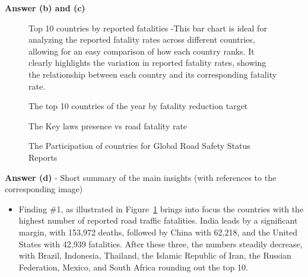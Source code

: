 \documentclass[a4paper,10pt]{article}\setlength{\textheight}{10in}\setlength{\textwidth}{6.5in}\setlength{\topmargin}{-0.125in}\setlength{\oddsidemargin}{-.2in}\setlength{\evensidemargin}{-.2in}\setlength{\headsep}{0.2in}\setlength{\footskip}{0pt}\usepackage{amsmath}\usepackage{fancyhdr}\usepackage{enumitem}\usepackage{hyperref}\usepackage{xcolor}\usepackage{graphicx}\usepackage[export]{adjustbox}\usepackage{caption}\usepackage{float}\usepackage{booktabs}\usepackage{makecell}\pagestyle{fancy}
\begin{document}
\begin{enumerate}[topsep=0mm, partopsep=0mm, leftmargin=*]
    
\textbf{Answer (b) and (c)}
    \begin{figure}[H]
        \centering
        \caption{Top 10 countries by reported fatalities -This bar chart is ideal for analyzing the reported fatality rates across different countries, allowing for an easy comparison of how each country ranks. It clearly highlights the variation in reported fatality rates, showing the relationship between each country and its corresponding fatality rate.}
        \label{fig:plot1}
    \end{figure}
    \begin{figure}[H]
        \centering
        \caption{The top 10 countries of the year by fatality reduction target}
        \label{fig:plot2}
    \end{figure}
    \begin{figure}[H]
        \centering
        \caption{The Key laws presence vs road fatality rate}
        \label{fig:plot3}
    \end{figure}
    \begin{figure}[H]
        \centering
        \caption{The Participation of countries for Global Road Safety Status Reports}
        \label{fig:plot4}
    \end{figure}

\textbf{Answer (d)} - Short summary of the main insights (with references to the corresponding image)
    \begin{itemize}
        \item Finding \#1, as illustrated in Figure~\ref{fig:plot1} brings into focus the countries with the highest number of reported road traffic fatalities. India leads by a significant margin, with 153,972 deaths, followed by China with 62,218, and the United States with 42,939 fatalities. After these three, the numbers steadily decrease, with Brazil, Indonesia, Thailand, the Islamic Republic of Iran, the Russian Federation, Mexico, and South Africa rounding out the top 10.


\end{itemize}
\end{enumerate}
\end{document}
